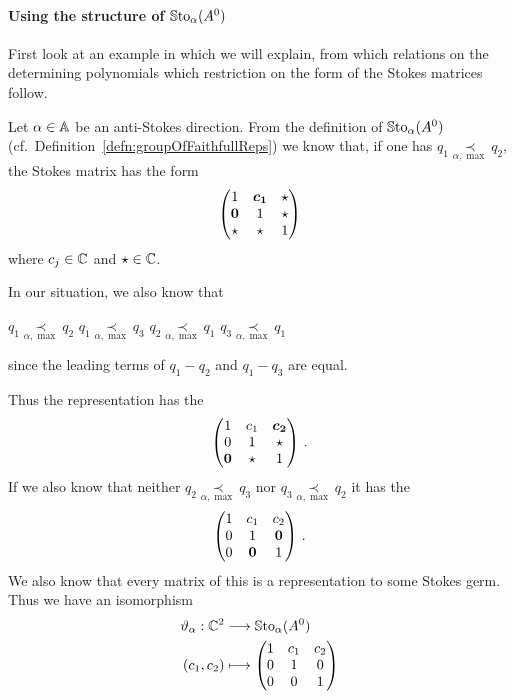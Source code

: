 \paragraph{Using the structure of $\operatorname{\mathbb{S}to}_\alpha(A^0)$}
First look at an example in which we will explain, from which relations on the
determining polynomials which restriction on the form of the Stokes matrices
follow.
\begin{exmp}
  Let $\alpha\in\mathbb{A}$ be an anti-Stokes direction.
  From the definition of $\operatorname{\mathbb{S}to}_\alpha(A^0)$ (cf.\
  Definition~\ref{defn:groupOfFaithfullReps}) we know that, if one has $q_1
  \underset{\alpha,\max}{\prec} q_2$, the Stokes matrix has the form
  \[
    \begin{pmatrix}
      1 & \text{\boldmath$c_1$} & \star
    \\\text{\boldmath$0$} & 1 & \star
    \\\star & \star & 1
    \end{pmatrix}
  \]
  where $c_j\in\mathbb{C}$ and $\star\in\mathbb{C}$.
  \begin{s-rem}
    In our situation, we also know that
    \begin{einr}
      $q_1 \underset{\alpha,\max}{\prec} q_2$
      \Leftrightarrow{}
      $q_1 \underset{\alpha,\max}{\prec} q_3$
      \qquad {} \qquad
      $q_2 \underset{\alpha,\max}{\prec} q_1$
      \Leftrightarrow{}
      $q_3 \underset{\alpha,\max}{\prec} q_1$
    \end{einr}
    since the leading terms of $q_1-q_2$ and $q_1-q_3$ are equal.
  \end{s-rem}
  Thus the representation has the 
  \[
    \begin{pmatrix}
      1 & c_1 & \text{\boldmath$c_2$}
    \\0 & 1 & \star
    \\\text{\boldmath$0$} & \star & 1
    \end{pmatrix}\,.
  \]
  If we also know that neither $q_2 \underset{\alpha,\max}{\prec} q_3$ nor
  $q_3 \underset{\alpha,\max}{\prec} q_2$ it has the \rewrite{form}
  \[
    \begin{pmatrix}
      1 & c_1 & c_2
    \\0 & 1 & \text{\boldmath$0$}
    \\0 & \text{\boldmath$0$} & 1
    \end{pmatrix}\,.
  \]
  We also know that every matrix of this  is a representation to
  some Stokes germ.
  Thus we have an isomorphism
  \begin{align*}
    \vartheta_\alpha:\mathbb{C}^2 &\longrightarrow \operatorname{\mathbb{S}to}_\alpha(A^0)
  \\(c_1,c_2)&\longmapsto
    \begin{pmatrix}
      1 & c_1 & c_2
    \\0 & 1 & 0
    \\0 & 0 & 1
    \end{pmatrix}
  \end{align*}
\end{exmp}
